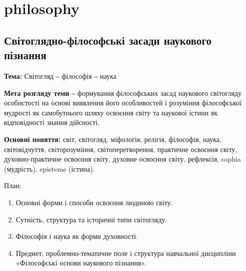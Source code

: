 \chapter{philosophy}
\minitoc


\section{Світоглядно-філософські засади наукового пізнання}

\textbf{Тема:} Світогляд ‒ філософія ‒ наука

\textbf{Мета розгляду теми} ‒ формування філософських засад наукового
світогляду особистості на основі виявлення його особливостей і розуміння
філософської мудрості як самобутнього шляху освоєння світу та наукової
істини як відповідності знання дійсності.

\textbf{Основні поняття:} світ, світогляд, міфологія, релігія, філософія, наука,
світовідчуття, світорозуміння, світоперетворення, практичне освоєння світу,
духовно-практичне освоєння світу, духовне освоєння світу, рефлексія, sophia
(мудрість), episteme (істина).

План:
\begin{enumerate}
\item Основні форми і способи освоєння людиною світу.
\item Сутність, структура та історичні типи світогляду.
\item Філософія і наука як форми духовності.
\item Предмет, проблемно-тематичне поле і структура навчальної дисципліни
	«Філософські основи наукового пізнання».
\end{enumerate}

